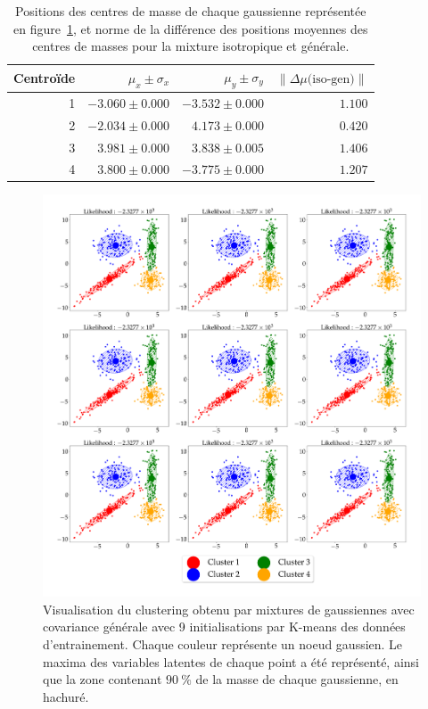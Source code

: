 \documentclass[12pt,a4paper,onecolumn]{article}
\begin{document}
\begin{table}[b]
	\centering
	\begin{tabular}{r|r|r|r}
		\hline
		Centroïde & \(\mu_x \pm \sigma_x\) & \(\mu_y \pm \sigma_y\) & \(\lVert\Delta\mu\text{(iso-gen)}\rVert\) \\\hline
		1         & \(-3.060\pm 0.000\)    & \(-3.532\pm 0.000\)    & \(1.100\)                                 \\\hline
		2         & \( -2.034 \pm 0.000\)  & \( 4.173\pm 0.000 \)   & \(0.420\)                                 \\\hline
		3         & \( 3.981\pm 0.000\)    & \( 3.838\pm 0.005\)    & \(1.406\)                                 \\\hline
		4         & \( 3.800\pm 0.000\)    & \( -3.775\pm 0.000 \)  & \(1.207\)                                 \\\hline
	\end{tabular}
	\caption{Positions des centres de masse de chaque gaussienne représentée en figure~\ref{fig_4_c}, et norme de la différence des positions moyennes des centres de masses pour la mixture isotropique et générale.}
	\label{tab_4_c}
\end{table}


\begin{figure}[H]
	\centering
	\includegraphics[width = \textwidth]{4_c}
	\caption{Visualisation du clustering obtenu par mixtures de gaussiennes avec covariance générale avec 9 initialisations par K-means des données d'entrainement. Chaque couleur représente un noeud gaussien. Le maxima des variables latentes de chaque point a été représenté, ainsi que la zone contenant \(90~\%\) de la masse de chaque gaussienne, en hachuré.}
	\label{fig_4_c}
\end{figure}
\end{document}
